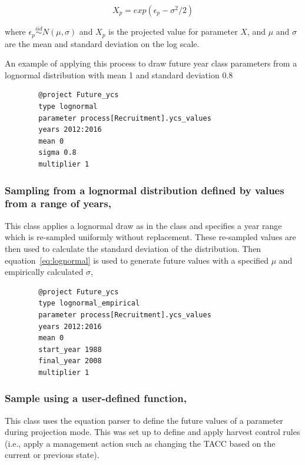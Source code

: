 \begin{equation}\label{eq:lognormal}
X_p = exp(\epsilon_p - \sigma^2 / 2)
\end{equation}

where $\epsilon_p\stackrel{iid}{\sim}N(\mu,\sigma)$ and $X_p$ is the projected value for parameter $X$, and $\mu$ and $\sigma$ are the mean and standard deviation on the log scale.

An example of applying this process to draw future year class parameters from a lognormal distribution with mean 1 and standard deviation 0.8

{\small{\begin{verbatim}
		@project Future_ycs
		type lognormal
		parameter process[Recruitment].ycs_values
		years 2012:2016
		mean 0
		sigma 0.8
		multiplier 1
		\end{verbatim}}}

\subsubsection[Lognormal-Empirical]{Sampling from a lognormal distribution defined by values from a range of years, }

This class applies a lognormal draw as in the  class and specifies a year range which is re-sampled uniformly without replacement. These re-sampled values are then used to calculate the standard deviation of the distribution. Then equation~\eqref{eq:lognormal} is used to generate future values with a specified $\mu$ and empirically calculated $\sigma$,

{\small{\begin{verbatim}
		@project Future_ycs
		type lognormal_empirical
		parameter process[Recruitment].ycs_values
		years 2012:2016
		mean 0
		start_year 1988
		final_year 2008
		multiplier 1
		\end{verbatim}}}

\subsubsection[User Defined]{Sample using a user-defined function, }

This class uses the equation parser to define the future values of a parameter during projection mode. This was set up to define and apply harvest control rules (i.e., apply a management action such as changing the TACC based on the current or previous state).

